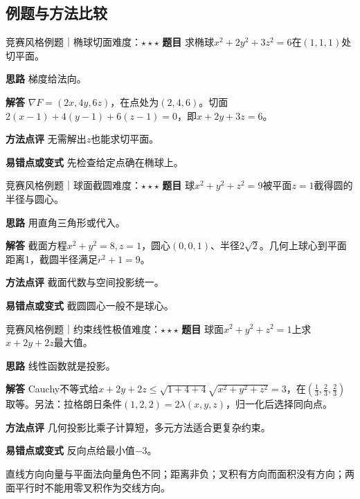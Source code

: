 \subsection{例题与方法比较}
\begin{example}{竞赛风格例题｜椭球切面}{难度：$\star\star\star$}
\label{ex:5:13}\textbf{题目} 求椭球$x^2+2y^2+3z^2=6$在$(1,1,1)$处切平面。\par
\textbf{思路} 梯度给法向。\par
\textbf{解答} $\nabla F=(2x,4y,6z)$，在点处为$(2,4,6)$。切面$2(x-1)+4(y-1)+6(z-1)=0$，即$x+2y+3z=6$。\par
\textbf{方法点评} 无需解出$z$也能求切平面。\par
\textbf{易错点或变式} 先检查给定点确在椭球上。
\end{example}
\begin{example}{竞赛风格例题｜球面截圆}{难度：$\star\star\star$}
\label{ex:5:14}\textbf{题目} 球$x^2+y^2+z^2=9$被平面$z=1$截得圆的半径与圆心。\par
\textbf{思路} 用直角三角形或代入。\par
\textbf{解答} 截面方程$x^2+y^2=8,z=1$，圆心$(0,0,1)$、半径$2\sqrt2$。几何上球心到平面距离1，截圆半径满足$r^2+1=9$。\par
\textbf{方法点评} 截面代数与空间投影统一。\par
\textbf{易错点或变式} 截圆圆心一般不是球心。
\end{example}
\begin{example}{竞赛风格例题｜约束线性极值}{难度：$\star\star\star$}
\label{ex:5:15}\textbf{题目} 球面$x^2+y^2+z^2=1$上求$x+2y+2z$最大值。\par
\textbf{思路} 线性函数就是投影。\par
\textbf{解答} Cauchy不等式给$x+2y+2z\le\sqrt{1+4+4}\sqrt{x^2+y^2+z^2}=3$，在$(\frac{1}{3},\frac{2}{3},\frac{2}{3})$取等。另法：拉格朗日条件$(1,2,2)=2\lambda(x,y,z)$，归一化后选择同向点。\par
\textbf{方法点评} 几何投影比乘子计算短，多元方法适合更复杂约束。\par
\textbf{易错点或变式} 反向点给最小值$-3$。
\end{example}
\begin{warning}直线方向向量与平面法向量角色不同；距离非负；叉积有方向而面积没有方向；两面平行时不能用零叉积作为交线方向。\end{warning}










